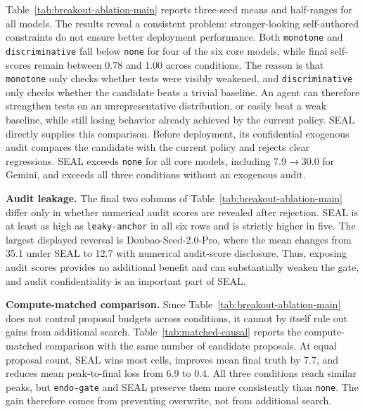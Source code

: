 \documentclass[letterpaper]{article} \usepackage{aaai2027}  \usepackage[hyphens]{url}  \usepackage{graphicx} \urlstyle{rm} \def\UrlFont{\rm}  \usepackage{natbib}  \usepackage{caption} \usepackage{amsfonts} \usepackage{multirow} \frenchspacing  \usepackage{algorithm}
\newcommand{\method}{SEAL}
\begin{document}
Table~\ref{tab:breakout-ablation-main} reports three-seed means and half-ranges for all models.
The results reveal a consistent problem: stronger-looking self-authored constraints do not ensure better deployment performance. 
Both \texttt{monotone} and \texttt{discriminative} fall below \texttt{none} for four of the six core models, while final self-scores remain between 0.78 and 1.00 across conditions. 
The reason is that \texttt{monotone} only checks whether tests were visibly weakened, and \texttt{discriminative} only checks whether the candidate beats a trivial baseline.
An agent can therefore strengthen tests on an unrepresentative distribution, or easily beat a weak baseline, while still losing behavior already achieved by the current policy. 
\method{} directly supplies this comparison. Before deployment, its confidential exogenous audit compares the candidate with the current policy and rejects clear regressions. \method{} exceeds \texttt{none} for all core models, including 7.9$\rightarrow$30.0 for Gemini, and exceeds all three conditions without an exogenous audit. 


















\textbf{Audit leakage.}
The final two columns of Table~\ref{tab:breakout-ablation-main} differ only in whether numerical audit scores are revealed after rejection. SEAL is at least as high as
\texttt{leaky-anchor} in all six rows and is strictly higher in five. The largest displayed reversal is Doubao-Seed-2.0-Pro, where the mean changes from 35.1 under SEAL to 12.7 with numerical audit-score disclosure. 
Thus, exposing audit scores provides no additional benefit and can substantially weaken the gate, and audit confidentiality is an important part of \method{}.



\textbf{Compute-matched comparison.}
Since Table~\ref{tab:breakout-ablation-main} does not control proposal budgets across conditions, it cannot by itself rule out gains from additional search. 
Table~\ref{tab:matched-causal} reports the compute-matched comparison with the same number of candidate proposals. At equal proposal count, \method{} wins most cells, improves mean final truth by 7.7, and reduces mean peak-to-final loss from 6.9 to 0.4. 
All three conditions reach similar peaks, but 
\texttt{endo-gate} and \method{} preserve them more consistently than \texttt{none}. 
The gain therefore comes from preventing overwrite, not from additional search.
\end{document}
